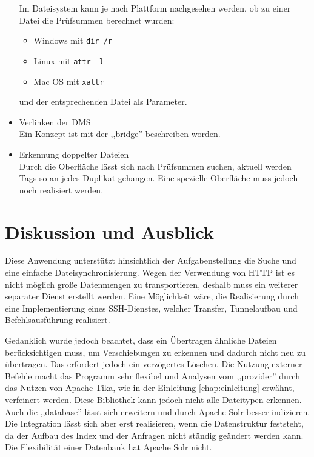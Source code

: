 \documentclass[oneside, ngerman, toc=bibliography,bibliography=totoc,listof=entryprefix, open=right,numbers=noenddot,fontsize=12pt]{scrbook}
\begin{document}
\begin{itemize}
    Im Dateisystem kann je nach Plattform nachgesehen werden, ob zu einer Datei die Prüfsummen berechnet wurden:
    \begin{itemize}
        \item Windows mit \verb|dir /r|
        \item Linux mit \verb|attr -l|
        \item Mac OS mit \verb|xattr|
    \end{itemize}
    
    und der entsprechenden Datei als Parameter.
    
	\item Verlinken der DMS \\
    Ein Konzept ist mit der ,,bridge'' beschreiben worden.
	\item Erkennung doppelter Dateien\\
Durch die Oberfläche lässt sich nach Prüfsummen suchen, aktuell werden Tags so an jedes Duplikat gehangen. Eine spezielle Oberfläche muss jedoch noch realisiert werden.
\end{itemize}



\section{Diskussion und Ausblick}
Diese Anwendung unterstützt hinsichtlich der Aufgabenstellung die Suche und eine einfache Dateisynchronisierung.
Wegen der Verwendung von HTTP ist es nicht möglich große Datenmengen zu transportieren, deshalb muss ein weiterer separater Dienst erstellt werden. Eine Möglichkeit wäre, die Realisierung durch eine Implementierung eines SSH-Dienstes, welcher Transfer, Tunnelaufbau und Befehlsausführung realisiert. 

Gedanklich wurde jedoch beachtet, dass ein Übertragen ähnliche Dateien berücksichtigen muss, um Verschiebungen zu erkennen und dadurch nicht neu zu übertragen. Das erfordert jedoch ein verzögertes Löschen. Die Nutzung externer Befehle macht das Programm sehr flexibel und Analysen vom ,,provider'' durch das Nutzen von Apache Tika, wie in der Einleitung \ref{chap:einleitung} erwähnt, verfeinert werden. Diese Bibliothek kann jedoch nicht alle Dateitypen erkennen.
Auch die ,,database'' lässt sich erweitern und durch \href{http://lucene.apache.org/solr/}{ Apache Solr}
besser indizieren. Die Integration lässt sich aber erst realisieren, wenn die Datenstruktur feststeht, da der Aufbau des Index und der Anfragen nicht ständig geändert werden kann. Die Flexibilität einer Datenbank hat Apache Solr nicht.
\end{document}

